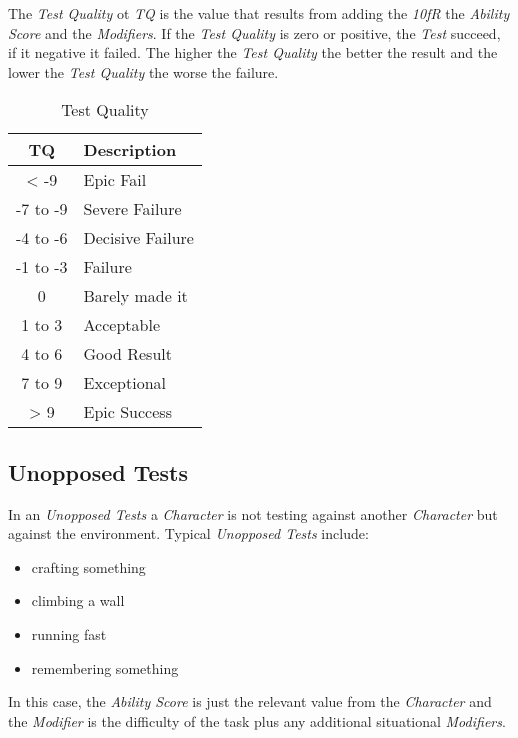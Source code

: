 The \emph{Test Quality} ot \emph{TQ} is the value that results from adding the
\emph{10fR} the \emph{Ability Score} and the \emph{Modifiers}. If the
\emph{Test Quality} is zero or positive, the \emph{Test} succeed, if it negative
it failed. The higher the \emph{Test Quality} the better the result and the lower
the \emph{Test Quality} the worse the failure.


\begin{table}[htb]
    \caption[Test Quality]{Test Quality}
    \label{tab:test quality}
    \centering
    \begin{tabular}{cl}
        \toprule
        \textbf{TQ} & \textbf{Description} \\
        \midrule
        < -9        & Epic Fail            \\
        -7 to -9    & Severe Failure       \\
        -4 to -6    & Decisive Failure     \\
        -1 to -3    & Failure              \\
        0           & Barely made it       \\
        1 to 3      & Acceptable           \\
        4 to 6      & Good Result          \\
        7 to 9      & Exceptional          \\
        > 9         & Epic Success         \\
        \bottomrule
    \end{tabular}
\end{table}

\subsection{Unopposed Tests}

In an \emph{Unopposed Tests} a \emph{Character} is not testing against another
\emph{Character} but against the environment. Typical \emph{Unopposed Tests} include:

\begin{itemize}[parsep=0em]
    \item crafting something
    \item climbing a wall
    \item running fast
    \item remembering something
\end{itemize}

In this case, the \emph{Ability Score} is just the relevant value from the
\emph{Character} and the \emph{Modifier} is the difficulty of the task plus any
additional situational \emph{Modifiers}.

